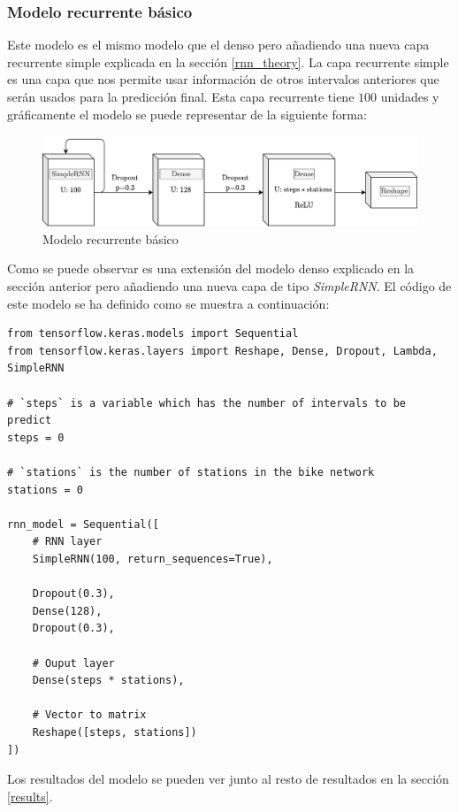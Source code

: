 \subsubsection{Modelo recurrente básico}

Este modelo es el mismo modelo que el denso pero añadiendo una nueva capa recurrente simple explicada en la sección \ref{rnn_theory}. La capa recurrente simple es una capa que nos permite usar información de otros intervalos anteriores que serán usados para la predicción final. Esta capa recurrente tiene $100$ unidades y gráficamente el modelo se puede representar de la siguiente forma:
\begin{figure}[H]
    \centering
    \includegraphics[width=12cm]{images/solution/models/simpleRnn.png}
    \caption{Modelo recurrente básico}
    \label{fig:dense-model}
\end{figure}

Como se puede observar es una extensión del modelo denso explicado en la sección anterior pero añadiendo una nueva capa de tipo \textit{SimpleRNN}. El código de este modelo se ha definido como se muestra a continuación:
\begin{verbatim}
from tensorflow.keras.models import Sequential
from tensorflow.keras.layers import Reshape, Dense, Dropout, Lambda, SimpleRNN

# `steps` is a variable which has the number of intervals to be predict
steps = 0 

# `stations` is the number of stations in the bike network
stations = 0

rnn_model = Sequential([
    # RNN layer
    SimpleRNN(100, return_sequences=True),
    
    Dropout(0.3),
    Dense(128),
    Dropout(0.3),
    
    # Ouput layer
    Dense(steps * stations),
    
    # Vector to matrix
    Reshape([steps, stations])
])
\end{verbatim}


Los resultados del modelo se pueden ver junto al resto de resultados en la sección \ref{results}.
